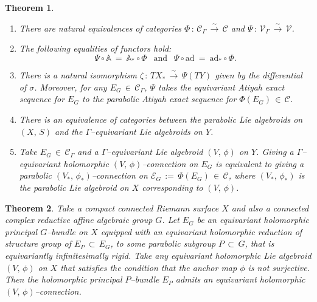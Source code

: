 \documentclass[10pt,a4paper]{amsart}
\newtheorem{theorem}{Theorem}
\begin{document}
\begin{theorem}\label{char}\mbox{}
\begin{enumerate}
\item There are natural equivalences of categories $\Phi\,:\,\mathscr{C}_{\Gamma}\,\overset{\sim}\longrightarrow
\, \mathscr{C}$ and $\Psi\,:\,\mathscr{V}_{\Gamma}\,\overset{\sim}\longrightarrow \,\mathscr{V}$. 

\item The following equalities of functors hold:
$$\Psi\circ\mathbb{A}\ = \ \mathbb{A}_{*}\circ\Phi\ \ \text{ and }\ \ \Psi\circ\mathrm{ad}\ =\ \mathrm{ad}_{*}\circ\Phi .$$

\item There is a natural isomorphism $\zeta\,:\,TX_{*}\, \overset{\sim}\longrightarrow\, \Psi(TY)$
given by the differential of $\sigma$. Moreover, for any $E_{G}\,\in\, \mathscr{C}_{\Gamma}$,
$\Psi$ takes the equivariant Atiyah exact sequence for 
$E_{G}$ to the parabolic Atiyah exact sequence for $\Phi(E_{G})\,\in\,\mathscr{C}$.

\item There is an equivalence of categories between the parabolic Lie algebroids on $(X,\,S)$ and the
$\Gamma$--equivariant Lie algebroids on $Y$. 

\item Take $E_{G}\,\in\, \mathscr{C}_{\Gamma}$ and a $\Gamma$--equivariant Lie algebroid
$(V,\,\phi)$ on $Y$. Giving a $\Gamma$--equivariant holomorphic $(V,\,\phi)$--connection on $E_{G}$ is equivalent
to giving a parabolic $(V_{*},\, \phi_{*})$--connection on $\mathcal{E}_{G}\,:=\,\Phi(E_{G})\,\in
\, \mathscr{C}$, where $(V_{*},\, \phi_{*})$ is the parabolic Lie algebroid on $X$ corresponding to
$(V,\, \phi)$.
\end{enumerate}
\end{theorem}

\begin{theorem}\label{4.1}
Take a compact connected Riemann surface $X$ and also a connected complex reductive affine algebraic group
$G$. Let $E_{G}$ be an equivariant holomorphic principal $G$--bundle on $X$ equipped
with an equivariant holomorphic reduction of structure group of $E_{P}\,\subset\, E_{G}$, to some parabolic
subgroup $P\, \subset\, G$, that is equivariantly infinitesimally rigid. Take any equivariant holomorphic
Lie algebroid $(V,\,\phi)$ on $X$ that satisfies the condition that the anchor map $\phi$ is not
surjective. Then
the holomorphic principal $P$--bundle $E_{P}$ admits an equivariant holomorphic $(V,\,\phi)$--connection.
\end{theorem}
\end{document}

